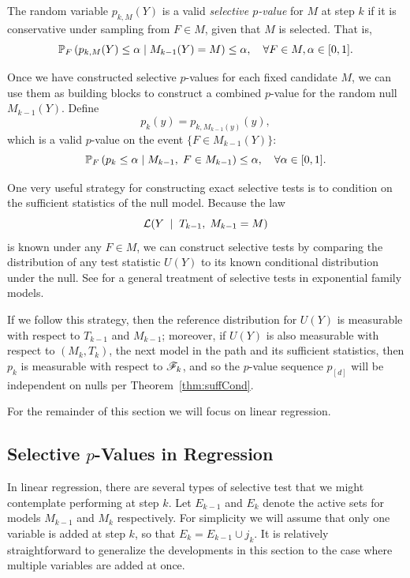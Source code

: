 \documentclass{article}
\begin{document}
The random variable  $p_{k,M}(Y)$ is a valid {\em selective $p$-value} for $M$ at step $k$ if it is conservative under sampling from $F\in M$, given that $M$ is selected. That is,
\[
\P_F\left(p_{k,M}(Y) \leq \alpha \mid M_{k-1}(Y) = M\right) 
\leq \alpha, \quad \forall F\in M, \alpha \in [0,1].
\]

Once we have constructed selective $p$-values for each fixed candidate $M$, we can use them as building blocks to construct a combined $p$-value for the random null $M_{k-1}(Y)$. Define
\[
p_k(y) = p_{k, M_{k-1}(y)}(y),
\]
which is a valid $p$-value on the event $\{F \in M_{k-1}(Y)\}$:
\begin{equation}\label{eq:selectiveGuaranteePk}
\P_F\left(p_k \leq \alpha \mid M_{k-1}, 
  \;F\in M_{k-1}\right) \leq \alpha, \quad \forall \alpha \in [0,1].
\end{equation}

One very useful strategy for constructing exact selective tests is to condition on the sufficient statistics of the null model. Because the law
\[
\L(Y \;\mid\; T_{k-1}, \; M_{k-1}=M)
\]
is known under any $F\in M$, we can construct selective tests by comparing the distribution of any test statistic $U(Y)$ to its known conditional distribution under the null. See \citet{fithian2014optimal} for a general treatment of selective tests in exponential family models.

If we follow this strategy, then the reference distribution for $U(Y)$ is measurable with respect to $T_{k-1}$ and $M_{k-1}$; moreover, if $U(Y)$ is also measurable with respect to $(M_k, T_k)$, the next model in the path and its sufficient statistics, then $p_k$ is measurable with respect to $\sF_k$, and so the $p$-value sequence $p_{[d]}$ will be independent on nulls per Theorem~\ref{thm:suffCond}.

For the remainder of this section we will focus on linear regression.

\subsection{Selective $p$-Values in Regression}

In linear regression, there are several types of selective test that we might contemplate performing at step $k$. Let $E_{k-1}$ and $E_k$ denote the active sets for models $M_{k-1}$ and $M_k$ respectively. For simplicity we will assume that only one variable is added at step $k$, so that $E_k = E_{k-1} \cup j_k$. It is relatively straightforward to generalize the developments in this section to the case where multiple variables are added at once.
\end{document}

